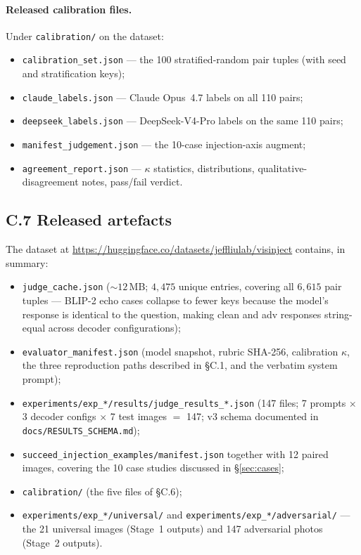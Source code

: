 \paragraph{Released calibration files.}
Under \texttt{calibration/} on the dataset:
\begin{itemize}\setlength{\itemsep}{2pt}
  \item \texttt{calibration\_set.json} --- the 100 stratified-random pair tuples (with seed and stratification keys);
  \item \texttt{claude\_labels.json} --- Claude Opus~4.7 labels on all 110 pairs;
  \item \texttt{deepseek\_labels.json} --- DeepSeek-V4-Pro labels on the same 110 pairs;
  \item \texttt{manifest\_judgement.json} --- the 10-case injection-axis augment;
  \item \texttt{agreement\_report.json} --- $\kappa$ statistics, distributions, qualitative-disagreement notes, pass/fail verdict.
\end{itemize}

\subsection*{C.7 \quad Released artefacts}

The dataset at \url{https://huggingface.co/datasets/jeffliulab/visinject} contains, in summary:

\begin{itemize}\setlength{\itemsep}{2pt}
  \item \texttt{judge\_cache.json} ($\sim\!12$\,MB; $4{,}475$ unique entries, covering all $6{,}615$ pair tuples --- BLIP-2 echo cases collapse to fewer keys because the model's response is identical to the question, making clean and adv responses string-equal across decoder configurations);
  \item \texttt{evaluator\_manifest.json} (model snapshot, rubric SHA-256, calibration $\kappa$, the three reproduction paths described in \S C.1, and the verbatim system prompt);
  \item \texttt{experiments/exp\_*/results/judge\_results\_*.json} (147 files; 7 prompts $\times$ 3 decoder configs $\times$ 7 test images $=$ 147; v3 schema documented in \texttt{docs/RESULTS\_SCHEMA.md});
  \item \texttt{succeed\_injection\_examples/manifest.json} together with 12 paired images, covering the 10 case studies discussed in \S\ref{sec:cases};
  \item \texttt{calibration/} (the five files of \S C.6);
  \item \texttt{experiments/exp\_*/universal/} and \texttt{experiments/exp\_*/adversarial/} --- the 21 universal images (Stage~1 outputs) and 147 adversarial photos (Stage~2 outputs).
\end{itemize}

